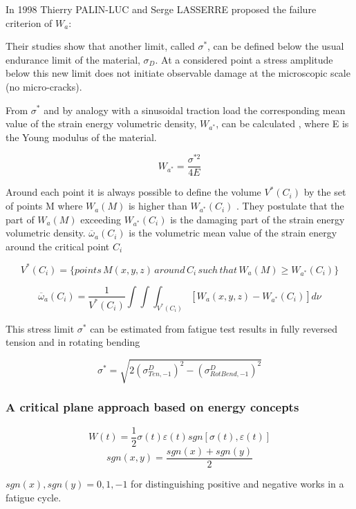 \documentclass[3p,times,procedia,number]{elsarticle}
\begin{document}
         In 1998 Thierry PALIN-LUC and Serge LASSERRE \cite{palin1998energy} proposed the failure criterion of $W_a$:
         
         Their studies show that another limit, called $\sigma^*$, can be defined below
         the usual endurance limit of the material, $\sigma_D$. At a considered point a stress amplitude
         below this new limit does not initiate observable damage at the microscopic scale (no
         micro-cracks).
         
         From $\sigma^*$ and by analogy with a sinusoidal traction load the corresponding mean value
         of the strain energy volumetric density, $W_{a^*}$, can be calculated , where E is the
         Young modulus of the material.
         
         $$W_{a^*}=\frac{\sigma^{*2}}{4E}$$
         
         Around each point it is always possible to define
         the volume $V^* (C_i)$ by the set of points M where $W_a (M)$ is higher than $W_{a^*} (C_i)$
         . They postulate that the part of $W_a (M)$ exceeding $W_{a^*} (C_i)$ is the damaging part
         of the strain energy volumetric density.  $\overline{\omega}_a(C_i)$ is
         the volumetric mean value of the strain energy around the critical point $C_i$
         
         $$V^*(C_i)=\lbrace points\, M(x,y,z) \,around\, C_i \,such\, that \,W_a(M)\geqslant W_{a^*}(C_i) \rbrace$$
         
         $$\overline{\omega}_a(C_i)=\frac{1}{V^*(C_i)}\int\int\int_{V^*(C_i)}^{}[W_a(x,y,z)-W_{a^*}(C_i)]d\nu$$
         
         This stress limit $\sigma^*$ can be estimated from
         fatigue test results in fully reversed tension and in rotating
         bending
         
         $$\sigma^*=\sqrt{2(\sigma_{Ten,-1}^D)^2-(\sigma_{RotBend,-1}^D)^2}$$
         
         
         \subsubsection{A critical plane approach based on energy concepts}
         $$W(t)=\frac{1}{2}\sigma(t)\varepsilon(t)sgn[\sigma(t),\varepsilon(t)]$$
         $$sgn(x,y)=\frac{sgn(x)+sgn(y)}{2}$$
         
         $sgn(x),sgn(y)=0,1,-1$ for distinguishing positive and negative works in a
         fatigue cycle\cite{lagoda1999critical}.
         
\end{document}
